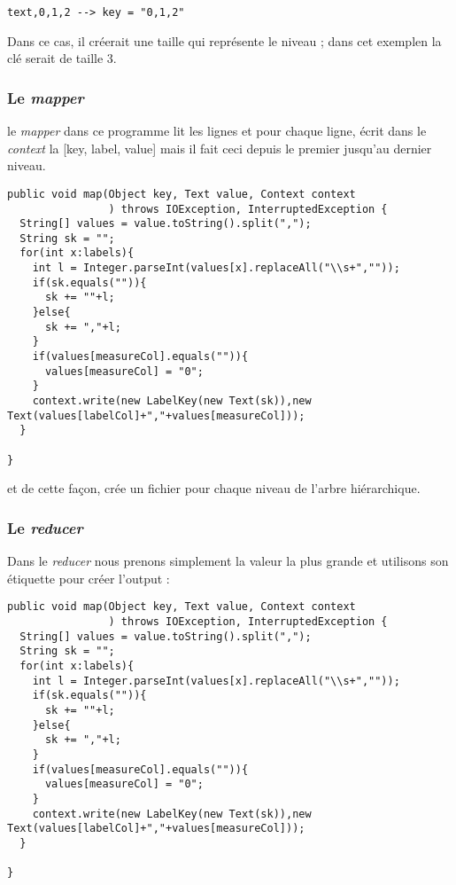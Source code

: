 \documentclass[12pt]{article}
\begin{document}
\begin{verbatim}
text,0,1,2 --> key = "0,1,2"
\end{verbatim}

Dans ce cas, il créerait une taille qui représente le niveau ; dans cet exemplen la clé serait de taille 3.

\subsubsection{Le \emph{mapper}}
\label{sec:org90eeb28}

le \emph{mapper} dans ce programme lit les lignes et pour chaque ligne, écrit dans le \emph{context} la 
[key, label, value] mais il fait ceci depuis le premier jusqu'au dernier niveau. 

\begin{verbatim}
public void map(Object key, Text value, Context context
                ) throws IOException, InterruptedException {
  String[] values = value.toString().split(",");
  String sk = "";
  for(int x:labels){
    int l = Integer.parseInt(values[x].replaceAll("\\s+",""));
    if(sk.equals("")){
      sk += ""+l;
    }else{
      sk += ","+l;
    }
    if(values[measureCol].equals("")){
      values[measureCol] = "0";
    }
    context.write(new LabelKey(new Text(sk)),new Text(values[labelCol]+","+values[measureCol]));
  }

}
\end{verbatim}
et de cette façon, crée un fichier pour chaque niveau de l'arbre hiérarchique.


\subsubsection{Le \emph{reducer}}
\label{sec:org3396736}
Dans le \emph{reducer} nous prenons simplement la valeur la plus grande et utilisons son 
étiquette pour créer l'output : 

\begin{verbatim}
public void map(Object key, Text value, Context context
                ) throws IOException, InterruptedException {
  String[] values = value.toString().split(",");
  String sk = "";
  for(int x:labels){
    int l = Integer.parseInt(values[x].replaceAll("\\s+",""));
    if(sk.equals("")){
      sk += ""+l;
    }else{
      sk += ","+l;
    }
    if(values[measureCol].equals("")){
      values[measureCol] = "0";
    }
    context.write(new LabelKey(new Text(sk)),new Text(values[labelCol]+","+values[measureCol]));
  }

}
\end{verbatim}
\end{document}

